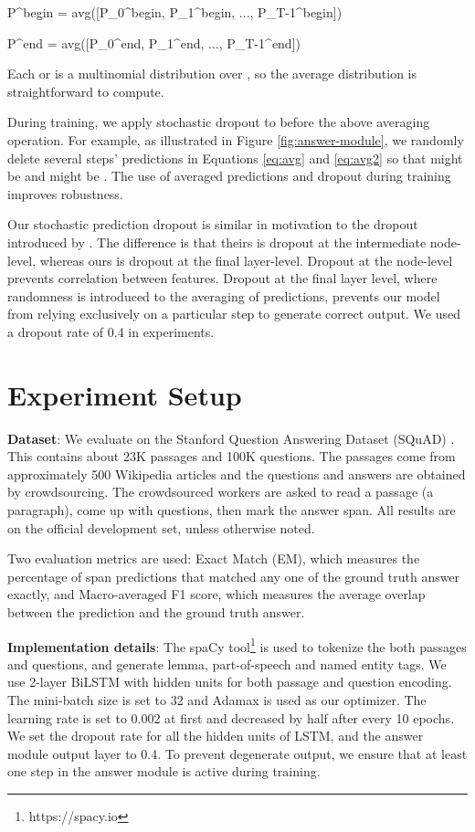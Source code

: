 \documentclass[11pt,a4paper]{article}
\begin{document}
P^{begin} = avg([P_0^{begin}, P_1^{begin}, ..., P_{T-1}^{begin}])
\label{eq:avg}

P^{end} = avg([P_0^{end}, P_1^{end}, ..., P_{T-1}^{end}])
\label{eq:avg2}
 
Each  or  is a multinomial distribution over , so the average distribution is straightforward to compute. 

During training, we apply stochastic dropout to before the above averaging operation. For example, as illustrated in Figure \ref{fig:answer-module}, we randomly delete several steps' predictions in Equations \ref{eq:avg} and \ref{eq:avg2} so that  might be  and  might be . The use of averaged predictions and dropout during training improves robustness. 

Our stochastic prediction dropout is similar in motivation to the dropout introduced by \cite{srivastava2014dropout}. The difference is that theirs is dropout at the intermediate node-level, whereas ours is dropout at the final layer-level.
Dropout at the node-level prevents correlation between features. 
Dropout at the final layer level, where randomness is introduced to the averaging of predictions, prevents our model from relying exclusively on a particular step to generate correct output. 
We used a dropout rate of 0.4 in experiments.

\section{Experiment Setup}
\label{sec:exp}
\vspace{-0.1cm}
\textbf{Dataset}: We evaluate on the Stanford Question Answering Dataset (SQuAD) \cite{rajpurkar2016squad}. This contains about 23K passages and 100K questions. The passages come from approximately 500 Wikipedia articles and the questions and answers are obtained by crowdsourcing. The crowdsourced workers are asked to read a passage (a paragraph), come up with questions, then mark the answer span. All results are on the official development set, unless otherwise noted. 

Two evaluation metrics are used: Exact Match (EM), which measures the percentage of span predictions that matched any one of the ground truth answer exactly, and Macro-averaged F1 score, which measures the average overlap between the prediction and the ground truth answer. 

\textbf{Implementation details}: The spaCy tool\footnote{https://spacy.io} is used to tokenize the both passages and questions, and generate lemma, part-of-speech and named entity tags. We use 2-layer BiLSTM with  hidden units for both passage and question encoding. The mini-batch size is set to 32 and Adamax \cite{kingma2014adam} is used as our optimizer. The learning rate is set to 0.002 at first and decreased by half after every 10 epochs. We set the dropout rate for all the hidden units of LSTM, and the answer module output layer to 0.4. To prevent degenerate output, we ensure that at least one step in the answer module is active during training.
\end{document}
